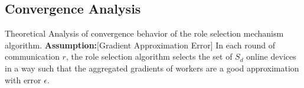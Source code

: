 \documentclass[lettersize,journal]{IEEEtran}
\begin{document}



\subsection{Convergence Analysis}
Theoretical Analysis of convergence behavior of the role selection mechanism algorithm.
\textbf{Assumption:}[Gradient Approximation Error]
In each round of communication $r$, the role selection algorithm selects the set of $S_d$ online devices in a way such that the aggregated gradients of workers are a good approximation with error $\epsilon$.
\end{document}

